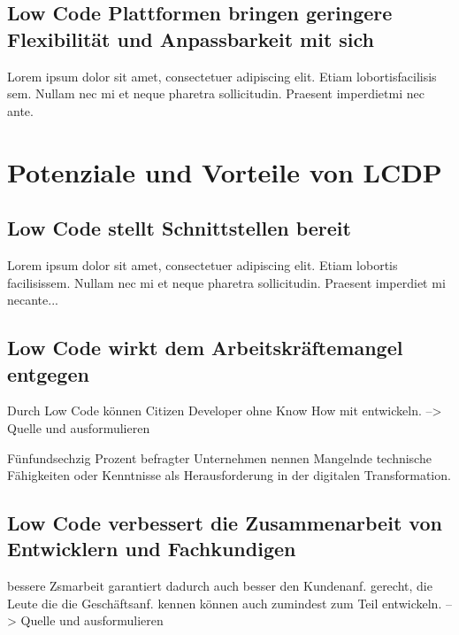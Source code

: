 \documentclass{article}
\begin{document}
	\subsection{Low Code Plattformen bringen geringere Flexibilität und Anpassbarkeit mit sich}	
	Lorem  ipsum  dolor  sit  amet,  consectetuer  adipiscing  
	elit.   Etiam  lobortisfacilisis sem.  Nullam nec mi et 
	neque pharetra sollicitudin.  Praesent imperdietmi nec ante.  
	
	\section{Potenziale und Vorteile von LCDP}
	
	
	\subsection{Low Code stellt Schnittstellen bereit} 
	Lorem ipsum dolor sit amet, consectetuer adipiscing elit.  
	Etiam lobortis facilisissem.  Nullam nec mi et neque pharetra 
	sollicitudin.  Praesent imperdiet mi necante...
	
	\subsection{Low Code wirkt dem Arbeitskräftemangel entgegen}
	Durch Low Code können Citizen Developer ohne Know How mit entwickeln. --> Quelle und ausformulieren
	
	Fünfundsechzig Prozent befragter Unternehmen nennen Mangelnde technische Fähigkeiten oder Kenntnisse als Herausforderung in der digitalen Transformation. \cite{EmmaVanPelt.2019} %
	
	\subsection{Low Code verbessert die Zusammenarbeit von Entwicklern und Fachkundigen}
	bessere Zsmarbeit garantiert dadurch auch besser den Kundenanf. gerecht, die Leute die die Geschäftsanf. kennen können auch zumindest zum Teil entwickeln. --> Quelle und ausformulieren
	
\end{document}

